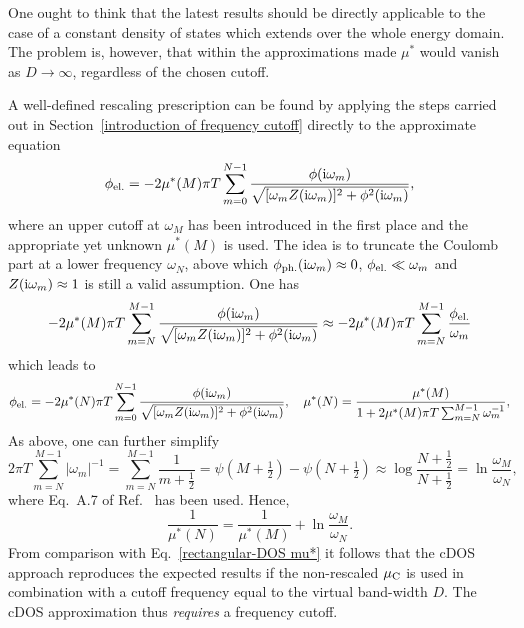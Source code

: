One ought to think that the latest results should be directly applicable to the
case of a constant density of states which extends over the whole energy domain.
The problem is, however, that within the approximations made $\mu^*$ would
vanish as $D \rightarrow \infty$, regardless of the chosen cutoff.

A well-defined rescaling prescription can be found by applying the steps carried
out in Section~\ref{introduction of frequency cutoff} directly to the
approximate  equation
%
\begin{equation} \label{approximate constant Coulomb contribution}
    \phi \sb{\text{el.}} = -2 \mu^*(M) \pi T \sum_{m = 0}^{N - 1}
    \frac
        {\phi(\mathrm i \omega_m)}
        {\sqrt{[\omega_m Z(\mathrm i \omega_m)]^2 + \phi^2(\mathrm i \omega_m)}},
\end{equation}
%
where an upper cutoff at $\omega_M$ has been introduced in the first place and
the appropriate yet unknown $\mu^*(M)$ is used. The idea is to truncate the
Coulomb part at a lower frequency $\omega_N$, above which $\phi \sb{\text{ph.}} (\mathrm i
\omega_m) \approx 0$, $\phi \sb{\text{el.}} \ll \omega_m$ and $Z(\mathrm i \omega_m) \approx
1$ is still a valid assumption. One has
%
\begin{equation*}
    -2 \mu^*(M) \pi T \sum_{m = N}^{M - 1}
    \frac
        {\phi(\mathrm i \omega_m)}
        {\sqrt{[\omega_m Z(\mathrm i \omega_m)]^2 + \phi^2(\mathrm i \omega_m)}}
    \approx -2 \mu^*(M) \pi T \sum_{m = N}^{M - 1}
    \frac{\phi \sb{\text{el.}}}{\omega_m}
\end{equation*}
%
which leads to
%
\begin{equation*}
    \phi \sb{\text{el.}} = -2 \mu^*(N) \pi T \sum_{m = 0}^{N - 1}
    \frac
        {\phi(\mathrm i \omega_m)}
        {\sqrt{[\omega_m Z(\mathrm i \omega_m)]^2 + \phi^2(\mathrm i \omega_m)}},
    \quad
    \mu^*(N) = \frac{\mu^*(M)}{1 + 2 \mu^*(M) \pi T
    \sum_{m = N}^{M - 1} \omega_m^{-1}},
\end{equation*}
%
As above, one can further simplify
%
\begin{equation*}
    2 \pi T \sum_{m = N}^{M - 1} |\omega_m|^{-1}
    = \sum_{m = N}^{M - 1} \frac 1 {m + \frac 1 2}
    = \psi(M + \tfrac 1 2) - \psi(N + \tfrac 1 2)
    \approx \log \frac{N + \frac 1 2}{N + \frac 1 2}
    = \ln \frac{\omega_M}{\omega_N},
\end{equation*}
%
where Eq.~A.7 of Ref.~ has been used. Hence,
%
\begin{equation*}
    \frac 1 {\mu^*(N)} = \frac 1 {\mu^*(M)} + \ln \frac{\omega_M}{\omega_N}.
\end{equation*}
%
From comparison with Eq.~\ref{rectangular-DOS mu*} it follows that the cDOS
approach reproduces the expected results if the non-rescaled $\mu \sb{\text{C}}$ is
used in combination with a cutoff frequency equal to the virtual band-width $D$.
The cDOS approximation thus \emph{requires} a frequency cutoff.

